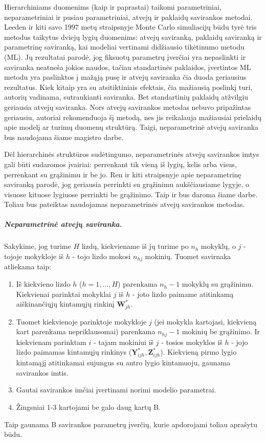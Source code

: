 \documentclass[12pt,a4paper]{article}
\begin{document}
\indent Hierarchiniams duomenims (kaip ir paprastai) taikomi parametriniai, neparametriniai ir pusiau parametriniai, atvejų ir paklaidų savirankos metodai. Leeden ir kiti \cite{bootML} savo 1997 metų straipsnyje Monte Carlo simuliacijų būdu tyrė tris metodus taikytus dviejų lygių duomenims: atvejų saviranką, paklaidų saviranką ir parametrinę saviranką, kai modeliai vertinami didžiausio tikėtinumo metodu (ML). Jų rezultatai parodė, jog fiksuotų parametrų įverčiai yra nepaslinkti ir saviranka neatneša jokios naudos, tačiau standartinės paklaidos, įvertintos ML metodu yra paslinktos į mažąją pusę ir atvejų saviranka čia duoda geriausius rezultatus. Kiek kitaip yra su atsitiktiniais efektais, čia mažiausią poslinkį turi, autorių vadinama, sutraukianti saviranka. Bet standartinių paklaidų atžvilgiu geriausia atvejų saviranka. Nors atvejų savirankos metodas nebuvo pripažintas geriausiu, autoriai rekomenduoja šį metodą, nes jis reikalauja mažiausiai prielaidų apie modelį ar turimų duomenų struktūrą. Taigi, neparametrinė atvejų saviranka bus naudojama šiame magistro darbe.

\indent Dėl hierarchinės struktūros sudėtingumo, neparametrinės atvejų savirankos imtys gali būti sudaromos įvairiai: perrenkant tik vieną iš lygių, kelis arba visus, perrenkant su grąžinimu ir be jo. Ren ir kiti \cite{bootNest} straipsnyje apie neparametrinę saviranką parodė, jog geriausia perrinkti su grąžinimu aukščiausiame lygyje, o visuose kituose lygiuose perrinkti be grąžinimo. Taip ir bus daroma šiame darbe. Toliau bus pateiktas naudojamas neparametrinės atvejų savirankos metodas.

\subparagraph{Neparametrinė atvejų saviranka.} Sakykime, jog turime $H$ lizdų, kiekviename iš jų turime po $n_h$ mokyklų, o $j$ - tojoje mokykloje iš $h$ - tojo lizdo mokosi $n_{hj}$ mokinių. Tuomet savirnaka atliekama taip:
\begin{enumerate}
\item Iš kiekvieno lizdo $h$ ($h=1,\dots,H$) parenkama $n_h-1$ mokyklų su grąžinimu. Kiekvienai parinktai mokyklai $j$ iš $h$ - joto lizdo paimame atitinkamą aiškinančiųjų kintamųjų rinkinį $\mathbf{W}^*_{jh}$.
\item Tuomet kiekvienoje parinktoje mokykloje $j$ (jei mokykla kartojasi, kiekvieną kart parenkama nepriklausomai) parenkama $n_{hj}-1$ mokinių be grąžinimo. Ir kiekvienam parinktam $i$ - tajam mokiniui iš $j$ - tosios mokyklos iš $h$ - jojo lizdo paimamas kintamųjų rinkinys ($\mathbf{Y}^*_{ijh}, \mathbf{Z}^*_{ijh}$). Kiekvieną pirmo lygio kintamąjį atitinkamai sujungus su antro lygio kintamuoju, gaunama savirankos imtis.
\item Gautai savirankos imčiai įvertinami norimi modelio parametrai.
\item Žingsniai 1-3 kartojami be galo daug kartų B.
\end{enumerate}
Taip gaunama B savirankos parametrų įverčių, kurie apdorojami toliau aprašytu būdu. 
\end{document}
